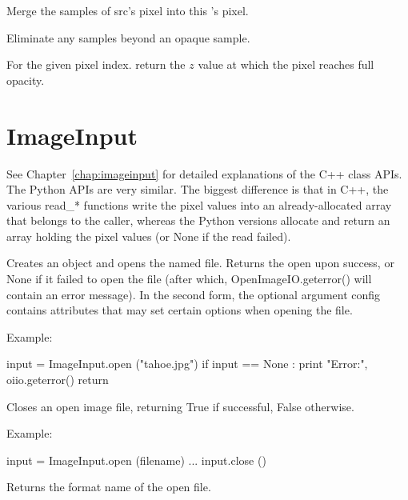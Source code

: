 Merge the samples of {\cf src}'s pixel into this \DeepData's pixel.
\apiend

Eliminate any samples beyond an opaque sample.
\apiend

\NEW %
For the given pixel index. return the $z$ value at which the pixel reaches
full opacity.
\apiend



\section{ImageInput}
\label{sec:pythonimageinput}

See Chapter~\ref{chap:imageinput} for detailed explanations of the
C++ \ImageInput class APIs. The Python APIs are very similar. The biggest
difference is that in C++, the various {\cf read_*} functions write the
pixel values into an already-allocated array that belongs to the caller,
whereas the Python versions allocate and return an array holding the pixel
values (or {\cf None} if the read failed).


Creates an \ImageInput object and opens the named file.  Returns the
open \ImageInput upon success, or {\cf None} if it failed to open the
file (after which, {\cf OpenImageIO.geterror()} will contain an error
message).  In the second form, the optional \ImageSpec argument 
{\cf config} contains attributes that may set certain options when opening
the file.

\noindent Example:
\begin{code}
    input = ImageInput.open ("tahoe.jpg")
    if input == None :
        print "Error:", oiio.geterror()
        return
\end{code}
\apiend

Closes an open image file, returning {\cf True} if successful, {\cf False}
otherwise.

\noindent Example:
\begin{code}
    input = ImageInput.open (filename)
    ...
    input.close ()
\end{code}
\apiend


Returns the format name of the open file.


